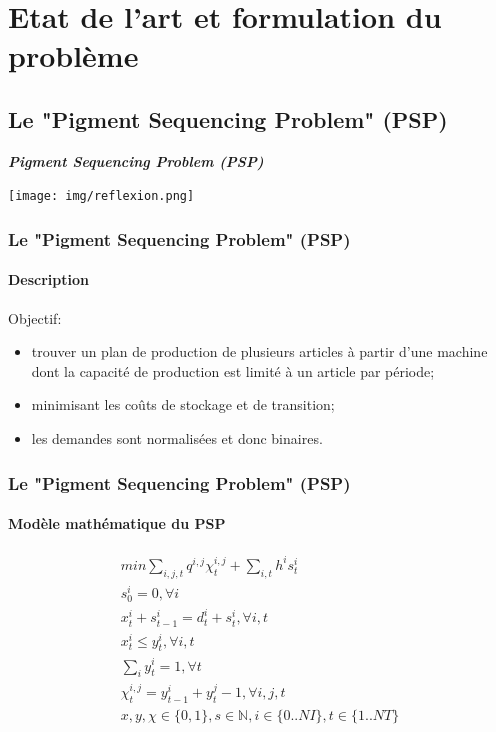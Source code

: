 \documentclass[11pt]{beamer}
\begin{document}
 \section{Etat de l'art et formulation du problème}
    
 \subsection{Le "Pigment Sequencing Problem" (PSP)}
 
 \begin{frame}
 	\begin{minipage}[c]{.46\linewidth}
      \Large{\emph{\textbf{Pigment Sequencing Problem (PSP) }}}
   \end{minipage} \hfill
   \begin{minipage}[c]{.46\linewidth}
		\texttt{[image: img/reflexion.png]}
   \end{minipage}
\end{frame}  
 
 \begin{frame}
 \transsplitverticalin
 \frametitle{Le "Pigment Sequencing Problem" (PSP)}
 \framesubtitle{Description}
 
 	Objectif:
    \begin{itemize}
    	\item<2-> trouver un plan de production de plusieurs articles à partir d’une
machine dont la capacité de production est limité à un article par période;
		\vspace*{.5cm}
    	\item<3-> minimisant les coûts de stockage et de transition;
    	\vspace*{.5cm}
    	\item<4-> les demandes sont normalisées et donc binaires.
    \end{itemize}
 \end{frame} 
 
 \begin{frame}
 \transboxout
 \frametitle{Le "Pigment Sequencing Problem" (PSP)}
 \framesubtitle{Modèle mathématique du PSP}
 	\begin{eqnarray}
		min \sum_{i,j,t} q^{i,j}\chi_{t}^{i,j} + \sum_{i,t} h^{i} s_{t}^{i} \\
		s_{0}^{i} = 0, \forall i \\
		x_{t}^{i} + s_{t-1}^{i} = d_{t}^{i} + s_{t}^{i}, \forall i,t \\
		x_{t}^{i} \leq y_{t}^{i}, \forall i,t \\
		\sum_{i} y_{t}^{i} = 1 , \forall t \\
		\chi_{t}^{i,j} = y_{t-1}^{i} + y_{t}^{j} - 1, \forall i,j,t \\
		x,y,\chi \in \{0,1\}, s \in \mathbb{N}, i \in \{0..NI\}, t \in \{1..NT\}
	\end{eqnarray}
 \end{frame} 
 
\end{document}
